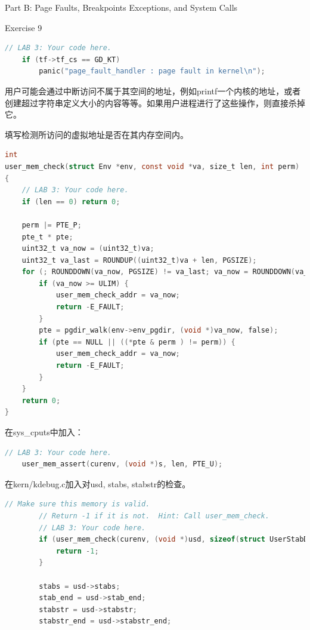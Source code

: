 \documentclass[GBK,winfonts,a4paper,10pt]{ctexart}
\begin{document}
\begin{section}{ Part B: Page Faults, Breakpoints Exceptions, and System Calls }
\begin{subsection}{ Exercise 9 }
\begin{lstlisting}[language=C]
	// LAB 3: Your code here.
	if (tf->tf_cs == GD_KT)
    	panic("page_fault_handler : page fault in kernel\n");
\end{lstlisting}

\par
用户可能会通过中断访问不属于其空间的地址，例如printf一个内核的地址，或者创建超过字符串定义大小的内容等等。如果用户进程进行了这些操作，则直接杀掉它。
\par
填写检测所访问的虚拟地址是否在其内存空间内。
\begin{lstlisting}[language=C]
int
user_mem_check(struct Env *env, const void *va, size_t len, int perm)
{
	// LAB 3: Your code here.
	if (len == 0) return 0;		

	perm |= PTE_P;
	pte_t * pte;
	uint32_t va_now = (uint32_t)va;
	uint32_t va_last = ROUNDUP((uint32_t)va + len, PGSIZE);
	for (; ROUNDDOWN(va_now, PGSIZE) != va_last; va_now = ROUNDDOWN(va_now + PGSIZE, PGSIZE)) {
		if (va_now >= ULIM) {
			user_mem_check_addr = va_now;
			return -E_FAULT;
		}
		pte = pgdir_walk(env->env_pgdir, (void *)va_now, false);
		if (pte == NULL || ((*pte & perm ) != perm)) {
			user_mem_check_addr = va_now;
			return -E_FAULT;
		}
	}
	return 0;
}
\end{lstlisting}
\par
在sys\_cputs中加入：
\begin{lstlisting}[language=C]
	// LAB 3: Your code here.
    user_mem_assert(curenv, (void *)s, len, PTE_U);
\end{lstlisting}

\par
在kern/kdebug.c加入对usd, stabs, stabstr的检查。
\begin{lstlisting}[language=C]
		// Make sure this memory is valid.
		// Return -1 if it is not.  Hint: Call user_mem_check.
		// LAB 3: Your code here.
		if (user_mem_check(curenv, (void *)usd, sizeof(struct UserStabData), PTE_U) < 0) {
			return -1;
		}

		stabs = usd->stabs;
		stab_end = usd->stab_end;
		stabstr = usd->stabstr;
		stabstr_end = usd->stabstr_end;


\end{lstlisting}
\end{subsection}
\end{section}
\end{document}
